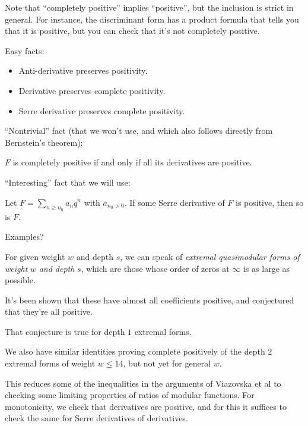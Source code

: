 \documentclass[reqno]{amsart} 
\begin{document}
Note that ``completely positive'' implies ``positive'', but the inclusion is strict in general.  For instance, the discriminant form has a product formula that tells you that it is positive, but you can check that it's not completely positive.

Easy facts:
\begin{theorem}
  \begin{itemize}
  \item Anti-derivative preserves positivity.
  \item Derivative preserves complete positivity.
  \item Serre derivative preserves complete positivity.
  \end{itemize}
\end{theorem}

``Nontrivial'' fact (that we won't use, and which also follows directly from Bernstein's theorem):
\begin{theorem}
  $F$ is completely positive if and only if all its derivatives are positive.
\end{theorem}

``Interesting'' fact that we will use:
\begin{theorem}
  Let $F = \sum_{n \geq n_0} a_n q^n$ with $a_{n _0 > 0}$.  If some Serre derivative of $F$ is positive, then so is $F$.
\end{theorem}

Examples?
\begin{definition}
  For given weight $w$ and depth $s$, we can speak of \emph{extremal quasimodular forms of weight} $w$ \emph{and depth} $s$, which are those whose order of zeros at $\infty$ is as large as possible.
\end{definition}
It's been shown that these have almost all coefficients positive, and conjectured that they're all positive.

\begin{theorem}
  That conjecture is true for depth $1$ extremal forms.
\end{theorem}

We also have similar identities proving complete positively  of the depth $2$ extremal forms of weight $w \leq 14$, but not yet for general $w$.

This reduces some of the inequalities in the arguments of Viazovska et al to checking some limiting properties of ratios of modular functions.  For monotonicity, we check that derivatives are positive,  and for this it suffices to check the same for Serre derivatives of derivatives.
\end{document}
